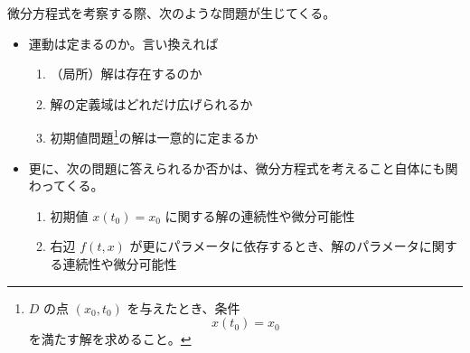 \documentclass[dvipdfmx, a4paper]{jsarticle}
\begin{document}
微分方程式を考察する際、次のような問題が生じてくる。

\begin{itemize}
    \item 運動は定まるのか。言い換えれば
        \begin{enumerate}
            \item （局所）解は存在するのか
            \item 解の定義域はどれだけ広げられるか
            \item 初期値問題\footnote{$D$ の点 $(x_0, t_0)$ を与えたとき、条件\begin{equation}x(t_0)=x_0\end{equation}を満たす解を求めること。}の解は一意的に定まるか
        \end{enumerate}
    \item 更に、次の問題に答えられるか否かは、微分方程式を考えること自体にも関わってくる。
        \begin{enumerate}
            \item 初期値 $x(t_0)=x_0$ に関する解の連続性や微分可能性
            \item 右辺 $f(t, x)$ が更にパラメータに依存するとき、解のパラメータに関する連続性や微分可能性
        \end{enumerate}
\end{itemize}
\end{document}
